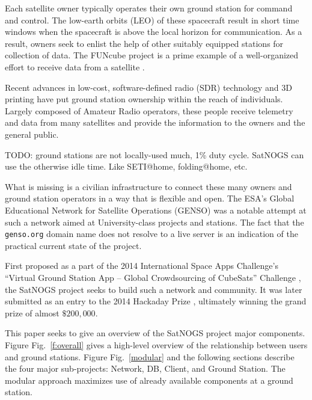 \documentclass[conference]{IEEEtran}
\newcommand{\figref}[1]{Fig.~\ref{#1}}
\begin{document}
Each satellite owner typically operates their own ground station for command and control.
The low-earth orbits (LEO) of these spacecraft result in short time windows when the spacecraft is above the local horizon for communication.
As a result, owners seek to enlist the help of other suitably equipped stations for collection of data.
The FUNcube project is a prime example of a well-organized effort to receive data from a satellite \cite{FUNcube}.

Recent advances in low-cost, software-defined radio (SDR) technology and 3D printing have put ground station ownership within the reach of individuals.
Largely composed of Amateur Radio operators, these people receive telemetry and data from many satellites and provide the information to the owners and the general public.


TODO: ground stations are not locally-used much, 1\% duty cycle.  SatNOGS can use the otherwise idle time.  Like SETI@home, folding@home, etc.

What is missing is a civilian infrastructure to connect these many owners and ground station operators in a way that is flexible and open.
The ESA's Global Educational Network for Satellite Operations (GENSO) \cite{GENSO} was a notable attempt at such a network aimed at University-class projects and stations.
The fact that the \verb|genso.org| domain name does not resolve to a live server is an indication of the practical current state of the project.

First proposed as a part of the 2014 International Space Apps Challenge's ``Virtual Ground Station App -- Global Crowdsourcing of CubeSats'' Challenge \cite{SpaceAppsChallenge2014-SatNOGS}, the SatNOGS project seeks to build such a network and community.
It was later submitted as an entry to the 2014 Hackaday Prize \cite{Hackaday-SatNOGS}, ultimately winning the grand prize of almost $\$200,000$.

This paper seeks to give an overview of the SatNOGS project major components.
Figure \figref{f:overall} gives a high-level overview of the relationship between users and ground stations.
Figure \figref{modular} and the following sections describe the four major sub-projects: Network, DB, Client, and Ground Station.
The modular approach maximizes use of already available components at a ground station.
\end{document}
